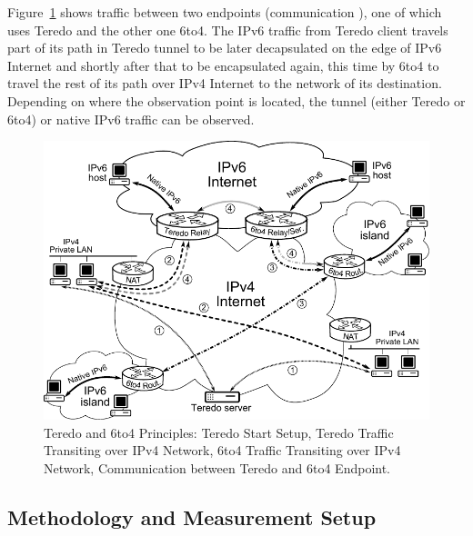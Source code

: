 Figure~\ref{fig:ipv6-tunnels-monitoring-schema} shows traffic between two endpoints (communication ), one of which uses Teredo and the other one 6to4. The IPv6 traffic from Teredo client travels part of its path in Teredo tunnel to be later decapsulated on the edge of IPv6 Internet and shortly after that to be encapsulated again, this time by 6to4 to travel the rest of its path over IPv4 Internet to the network of its destination. Depending on where the observation point is located, the tunnel (either Teredo or 6to4) or native IPv6 traffic can be observed.

\begin{figure}[!tb]
        \centering
        \includegraphics{figures/paper-tunnels/tunely-schema}
        \caption{Teredo and 6to4 Principles:  Teredo Start Setup,  Teredo Traffic Transiting over IPv4 Network,  6to4 Traffic Transiting over IPv4 Network,  Communication between Teredo and 6to4 Endpoint.}
        \label{fig:ipv6-tunnels-monitoring-schema}
\end{figure}


\subsection{Methodology and Measurement Setup} \label{subsec:ipv6-tunnels-met-mon-setup}

